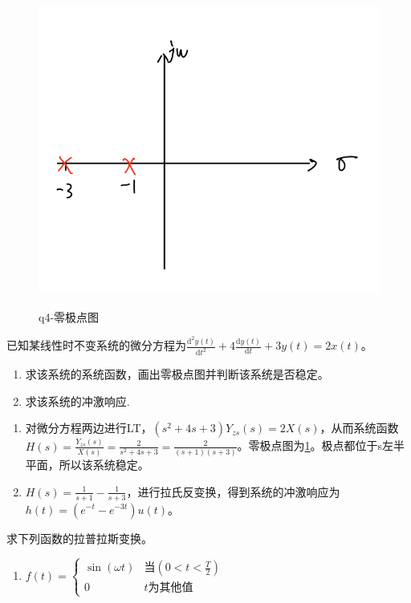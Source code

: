 \documentclass[answers]{exam}  %
\begin{document}
\begin{questions}
\begin{figure}[!h]
	\centering
	\includegraphics[width=0.5\linewidth]{pics/1.png}
	\label{Figure:q4}
	\caption{q4-零极点图}
\end{figure}
\question 已知某线性时不变系统的微分方程为$\frac{\mathrm{d}^2y(t)}{\mathrm{d}t^2}+4\frac{\mathrm{d}y(t)}{\mathrm{d}t}+3y(t)=2x(t)$。
\begin{enumerate}[(1)]
\item 求该系统的系统函数，画出零极点图并判断该系统是否稳定。
\item 求该系统的冲激响应.
\end{enumerate}
\begin{solution}
\begin{enumerate}[(1)]
	\item 对微分方程两边进行LT，$(s^2+4s+3)Y_{zs}(s)=2X(s)$，从而系统函数$H(s)=\frac{Y_{zs}(s)}{X(s)}=\frac{2}{s^2+4s+3}=\frac{2}{(s+1)(s+3)}$。零极点图为\ref{Figure:q4}。极点都位于s左半平面，所以该系统稳定。
	\item $H(s)=\frac{1}{s+1}-\frac{1}{s+3}$，进行拉氏反变换，得到系统的冲激响应为$h(t)=(e^{-t}-e^{-3t})u(t)$。
\end{enumerate}
\end{solution}

\question 求下列函数的拉普拉斯变换。
\begin{enumerate}[(1)]
\item $f(t)=\left\{\begin{matrix}
\sin(\omega t) & \text{当}\left(0<t<\frac{T}{2} \right )\\ 
 0& t\text{为其他值}
\end{matrix}\right.$


\end{enumerate}
\end{questions}
\end{document}
